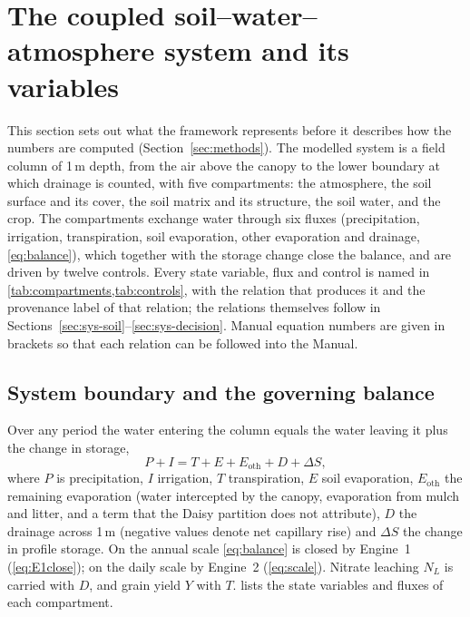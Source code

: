 \documentclass[preprint,12pt]{elsarticle}
\begin{document}
\section{The coupled soil--water--atmosphere system and its variables}
\label{sec:system}
This section sets out what the framework represents before it describes how the numbers are computed (Section~\ref{sec:methods}). The modelled system is a field column of 1\,m depth, from the air above the canopy to the lower boundary at which drainage is counted, with five compartments: the atmosphere, the soil surface and its cover, the soil matrix and its structure, the soil water, and the crop. The compartments exchange water through six fluxes (precipitation, irrigation, transpiration, soil evaporation, other evaporation and drainage, \cref{eq:balance}), which together with the storage change close the balance, and are driven by twelve controls. Every state variable, flux and control is named in \cref{tab:compartments,tab:controls}, with the relation that produces it and the provenance label of that relation; the relations themselves follow in Sections~\ref{sec:sys-soil}--\ref{sec:sys-decision}. Manual equation numbers are given in brackets so that each relation can be followed into the Manual.

\subsection{System boundary and the governing balance}
\label{sec:sys-balance}
Over any period the water entering the column equals the water leaving it plus the change in storage,
\begin{equation}
P+I=T+E+E_{\mathrm{oth}}+D+\Delta S,
\label{eq:balance}
\end{equation}
where $P$ is precipitation, $I$ irrigation, $T$ transpiration, $E$ soil evaporation, $E_{\mathrm{oth}}$ the remaining evaporation (water intercepted by the canopy, evaporation from mulch and litter, and a term that the Daisy partition does not attribute), $D$ the drainage across 1\,m (negative values denote net capillary rise) and $\Delta S$ the change in profile storage. On the annual scale \cref{eq:balance} is closed by Engine~1 (\cref{eq:E1close}); on the daily scale by Engine~2 (\cref{eq:scale}). Nitrate leaching $N_L$ is carried with $D$, and grain yield $Y$ with $T$.  lists the state variables and fluxes of each compartment.
\end{document}
